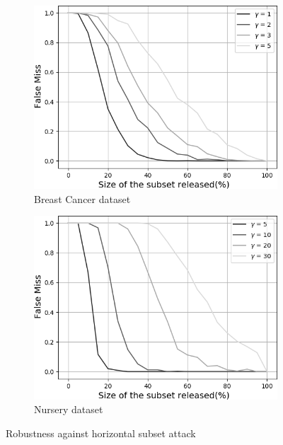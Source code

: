 \documentclass[runningheads]{llncs}
\begin{document}
\begin{figure}[th]
    \centering
    \begin{subfigure}{.42\textwidth}
        \includegraphics[width=1\linewidth]{figures/horizontal_subset_bc_grey.png}
        \caption{Breast Cancer dataset}
        \label{fig:horizontal-subset-bc}
    \end{subfigure}
    \hspace{0.02\textwidth}
    \begin{subfigure}{.42\textwidth}
        \includegraphics[width=1\linewidth]{figures/horizontal_subset_n_grey.png}
        \caption{Nursery dataset}
        \label{fig:horizontal-subset-n}
    \end{subfigure}
    \caption{Robustness against horizontal subset attack}
    \label{fig:horizontal-subset}
\end{figure}
\end{document}
